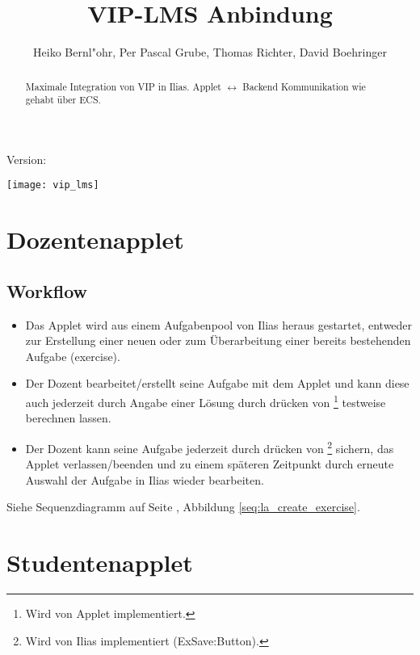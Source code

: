 \documentclass[12pt,a4paper]{article}
\newcommand{\button}[1]{\fbox{\texttt{#1}}}
\begin{document}
\title{VIP-LMS Anbindung}
\author{Heiko Bernl"ohr, Per Pascal Grube, Thomas Richter, David Boehringer}
\maketitle
\begin{center}
  Version: \gitVtag\\
\end{center}
\begin{abstract}
  Maximale Integration von VIP in Ilias. Applet $\leftrightarrow$ Backend
  Kommunikation wie gehabt über ECS.
\end{abstract}

\vspace{\fill}
\begin{center}
\texttt{[image: vip\_lms]}
\end{center}
\vspace{\fill}

\newpage

\section{Dozentenapplet}
\subsection{Workflow}
\begin{itemize}
  \item Das Applet wird aus einem Aufgabenpool von Ilias heraus gestartet,
    entweder zur Erstellung einer neuen oder zum Überarbeitung einer bereits
    bestehenden Aufgabe (exercise).
  \item Der Dozent bearbeitet/erstellt seine Aufgabe mit dem Applet und kann
    diese auch jederzeit durch Angabe einer Lösung durch drücken von
    \button{berechnen}\footnote{Wird von Applet implementiert.} testweise
    berechnen lassen.
  \item Der Dozent kann seine Aufgabe jederzeit durch drücken von
    \button{speichern}\footnote{Wird von Ilias implementiert (ExSave:Button).}
    sichern, das Applet verlassen/beenden und zu einem späteren Zeitpunkt durch
    erneute Auswahl der Aufgabe in Ilias wieder bearbeiten.
\end{itemize}
Siehe Sequenzdiagramm auf Seite \pageref{seq:la_create_exercise}, Abbildung \ref{seq:la_create_exercise}.

\section{Studentenapplet}
\end{document}
